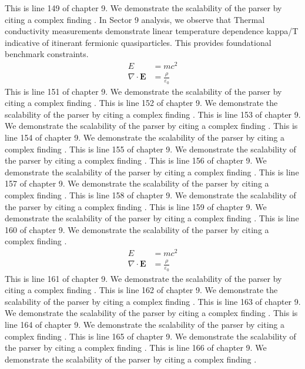 This is line 149 of chapter 9. We demonstrate the scalability of the parser by citing a complex finding \cite{ref9_149}.
In Sector 9 analysis, we observe that Thermal conductivity measurements demonstrate linear temperature dependence kappa/T indicative of itinerant fermionic quasiparticles. This provides foundational benchmark constraints.
\begin{align*}
  E &= mc^2 \\
  \nabla \cdot \mathbf{E} &= \frac{\rho}{\varepsilon_0}
\end{align*}
This is line 151 of chapter 9. We demonstrate the scalability of the parser by citing a complex finding \cite{ref9_151}.
This is line 152 of chapter 9. We demonstrate the scalability of the parser by citing a complex finding \cite{ref9_152}.
This is line 153 of chapter 9. We demonstrate the scalability of the parser by citing a complex finding \cite{ref9_153}.
This is line 154 of chapter 9. We demonstrate the scalability of the parser by citing a complex finding \cite{ref9_154}.
This is line 155 of chapter 9. We demonstrate the scalability of the parser by citing a complex finding \cite{ref9_155}.
This is line 156 of chapter 9. We demonstrate the scalability of the parser by citing a complex finding \cite{ref9_156}.
This is line 157 of chapter 9. We demonstrate the scalability of the parser by citing a complex finding \cite{ref9_157}.
This is line 158 of chapter 9. We demonstrate the scalability of the parser by citing a complex finding \cite{ref9_158}.
This is line 159 of chapter 9. We demonstrate the scalability of the parser by citing a complex finding \cite{ref9_159}.
This is line 160 of chapter 9. We demonstrate the scalability of the parser by citing a complex finding \cite{ref9_160}.
\begin{align*}
  E &= mc^2 \\
  \nabla \cdot \mathbf{E} &= \frac{\rho}{\varepsilon_0}
\end{align*}
This is line 161 of chapter 9. We demonstrate the scalability of the parser by citing a complex finding \cite{ref9_161}.
This is line 162 of chapter 9. We demonstrate the scalability of the parser by citing a complex finding \cite{ref9_162}.
This is line 163 of chapter 9. We demonstrate the scalability of the parser by citing a complex finding \cite{ref9_163}.
This is line 164 of chapter 9. We demonstrate the scalability of the parser by citing a complex finding \cite{ref9_164}.
This is line 165 of chapter 9. We demonstrate the scalability of the parser by citing a complex finding \cite{ref9_165}.
This is line 166 of chapter 9. We demonstrate the scalability of the parser by citing a complex finding \cite{ref9_166}.
